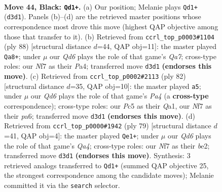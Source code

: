 \documentclass[11pt]{article}
\begin{document}
\clearpage

\begin{figure}[p]\centering
\begin{subfigure}{0.46\textwidth}\centering
\resizebox{\linewidth}{!}{%
\newchessgame
\chessboard[
  setfen={1k6/p1p2npp/1p2Q3/2p3P1/8/2Pq4/1P6/K7 b - - 4 44},
  showmover=false,
  pgfstyle=straightmove, color=movearrow, markmove={d3-d1}
]}
\caption{}
\end{subfigure}\hfill
\begin{subfigure}{0.46\textwidth}\centering
\resizebox{\linewidth}{!}{%
\newchessgame
\chessboard[
  setfen={6k1/Q4p2/6p1/p6p/Pq5P/6P1/5PK1/8 w - - 15 45},
  showmover=false,
  pgfstyle=straightmove, color=movearrow, markmove={a7-a8}
]}
\caption{}
\end{subfigure}
\\[4pt]
\begin{subfigure}{0.46\textwidth}\centering
\resizebox{\linewidth}{!}{%
\newchessgame
\chessboard[
  setfen={6k1/5p2/p3p1pp/2q5/P5P1/4PP2/5PK1/Q7 w - - 2 42},
  showmover=false,
  pgfstyle=straightmove, color=movearrow, markmove={a4-a5}
]}
\caption{}
\end{subfigure}\hfill
\begin{subfigure}{0.46\textwidth}\centering
\resizebox{\linewidth}{!}{%
\newchessgame
\chessboard[
  setfen={2k5/pp5p/3Q2p1/q1P2pP1/2P4P/8/4B3/2K5 b - - 0 40},
  showmover=false,
  pgfstyle=straightmove, color=movearrow, markmove={a5-e1}
]}
\caption{}
\end{subfigure}
\caption{\textbf{Move 44, Black: \texttt{Qd1+}.} (a) Our position; Melanie plays \texttt{Qd1+} (\texttt{d3d1}). Panels (b)--(d) are the retrieved master positions whose correspondence most drove this move (highest QAP objective among those that transfer to it). (b) Retrieved from \texttt{ccrl\_top\_p0003\#1104} (ply 88) [structural distance $d$=44, QAP obj=11]: the master played \texttt{Qa8+}; under $\mu$ our \emph{Qd6} plays the role of that game's \emph{Qa7}; cross-type roles: our \emph{N}f7 as their \emph{P}a4; transferred move \texttt{d3d1} \textbf{(endorses this move)}. (c) Retrieved from \texttt{ccrl\_top\_p0002\#2113} (ply 82) [structural distance $d$=35, QAP obj=10]: the master played \texttt{a5}; under $\mu$ our \emph{Qd6} plays the role of that game's \emph{Pa4} (a \textbf{cross-type} correspondence); cross-type roles: our \emph{P}c5 as their \emph{Q}a1, our \emph{N}f7 as their \emph{p}a6; transferred move \texttt{d3d1} \textbf{(endorses this move)}. (d) Retrieved from \texttt{ccrl\_top\_p0000\#1942} (ply 79) [structural distance $d$=41, QAP obj=4]: the master played \texttt{Qe1+}; under $\mu$ our \emph{Qd6} plays the role of that game's \emph{Qa4}; cross-type roles: our \emph{N}f7 as their \emph{b}e2; transferred move \texttt{d3d1} \textbf{(endorses this move)}. Synthesis: 3 retrieved analogs transferred to \texttt{Qd1+} (summed QAP objective 25, the strongest correspondence among the candidate moves); Melanie committed it via the \texttt{search} selector.}
\label{fig:thought-m87}
\end{figure}
\end{document}
